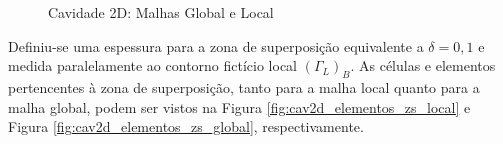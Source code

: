 \begin{figure}[!htbp]
	\caption{Cavidade 2D: Malhas Global e Local}
	\centering
	\label{fig:cav2d_discretização}
\end{figure}

Definiu-se uma espessura para a zona de superposição equivalente a $\delta = 0,1$ e medida paralelamente ao contorno fictício local $(\Gamma_{L})_{B}$. As células e elementos pertencentes à zona de superposição, tanto para a malha local quanto para a malha global, podem ser vistos na Figura \ref{fig:cav2d_elementos_zs_local} e Figura \ref{fig:cav2d_elementos_zs_global}, respectivamente.

